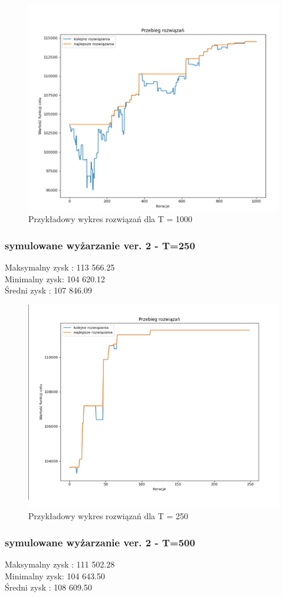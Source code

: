 \documentclass{article}
\begin{document}
\begin{figure}[H]
	\centering
	\includegraphics[width=0.7\linewidth]{screens/AnneallingV1_1000}
	\caption{Przykładowy wykres rozwiązań dla T = 1000}
	\label{fig:anneallingv11000}
\end{figure}


\subsubsection{symulowane wyżarzanie ver. 2 - T=250}
Maksymalny zysk :  113 566.25 \\
Minimalny zysk: 104 620.12 \\
Średni zysk : 107 846.09 \\

\begin{figure}[H]
	\centering
	\includegraphics[width=0.7\linewidth]{screens/AnneallingV2_250}
	\caption{Przykładowy wykres rozwiązań dla T = 250}
	\label{fig:anneallingv2250}
\end{figure}


\subsubsection{symulowane wyżarzanie ver. 2 - T=500}
Maksymalny zysk : 111 502.28 \\
Minimalny zysk: 104 643.50 \\
Średni zysk : 108 609.50 \\
\end{document}
